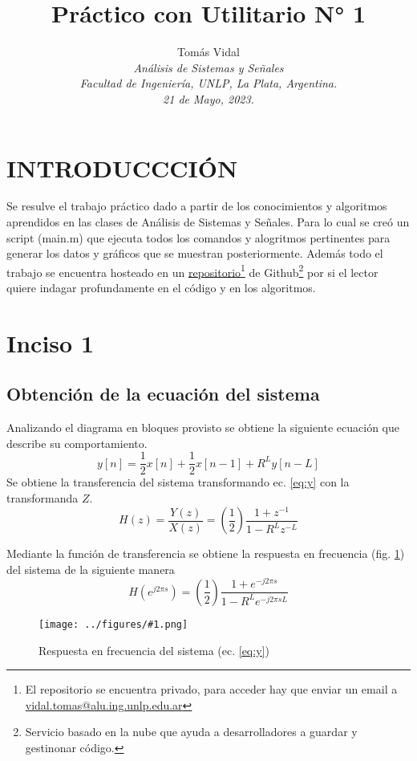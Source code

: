 \documentclass[letterpaper, 10 pt, conference]{ieeeconf}  %
\title{\LARGE \bf Pr\'actico con Utilitario N° 1}
\author{
  Tom\'as Vidal\\
  {\it An\'alisis de Sistemas y Se\~{n}ales}\\
  {\it Facultad de Ingenier\'ia, UNLP, La Plata, Argentina.}\\
  {\it 21 de Mayo, 2023.}
}                                            %
\newcommand{\image}[2] {
  \begin{figure}[H]
    \centering
    \texttt{[image: ../figures/\#1.png]}
    \caption{#2}
    \label{fig:#1}
  \end{figure}
}
\begin{document}
\maketitle
\thispagestyle{empty}
\pagestyle{empty}

\section{INTRODUCCCI\'ON}
Se resulve el trabajo pr\'actico dado a partir de los conocimientos y algoritmos aprendidos en las clases de Análisis de Sistemas y Se\~{n}ales. Para lo cual se cre\'o un script (main.m) que ejecuta todos los comandos y alogritmos pertinentes para generar los datos y gr\'aficos que se muestran posteriormente. Adem\'as todo el trabajo se encuentra hosteado en un \href{https://github.com/TomiVidal99/asys_tpn2}{repositorio}\footnote{El repositorio se encuentra privado, para acceder hay que enviar un email a \href{mailto:vidal.tomas@alu.ing.unlp.edu.ar}{vidal.tomas@alu.ing.unlp.edu.ar}} de Github\footnote{Servicio basado en la nube que ayuda a desarrolladores a guardar y gestinonar c\'odigo.} por si el lector quiere indagar profundamente en el c\'odigo y en los algoritmos.


\section{Inciso 1}

\subsection{Obtenci\'on de la ecuaci\'on del sistema}
Analizando el diagrama en bloques provisto se obtiene la siguiente ecuaci\'on que describe su comportamiento.
\begin{equation} \label{eq:y}
  y[n] = \frac{1}{2}x[n] + \frac{1}{2}x[n-1] + R^{L}y[n-L]
\end{equation}
Se obtiene la transferencia del sistema transformando ec. \ref{eq:y} con la transformanda $Z$.
\begin{equation} \label{eq:Hz}
  H(z) = \frac{Y(z)}{X(z)} = (\frac{1}{2})\frac{1 + z^{-1}}{1 - R^{L}z^{-L}}
\end{equation}

Mediante la funci\'on de transferencia se obtiene la respuesta en frecuencia (fig. \ref{fig:HfreqResp}) del sistema de la siguiente manera
\begin{equation*}
  H(e^{j2{\pi}s}) = (\frac{1}{2})\frac{1 + {e^{-j2{\pi}s}}}{1 - R^{L}{e^{-j2{\pi}sL}}}
\end{equation*}
\image{HfreqResp}{Respuesta en frecuencia del sistema (ec. \ref{eq:y})}
\end{document}
